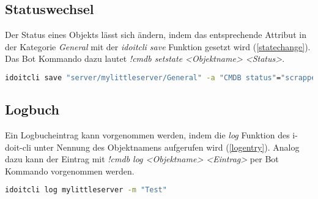 \subsection{Statuswechsel}
Der Status eines Objekts lässt sich ändern, indem das entsprechende Attribut in der Kategorie \textit{General} mit der \textit{idoitcli save} Funktion gesetzt wird (\autoref{statechange}). Das Bot Kommando dazu lautet \textit{!cmdb setstate <Objektname> <Status>}.
\begin{lstlisting}[language=bash, label=statechange, caption=Statuswechsel eines Objekts]
idoitcli save "server/mylittleserver/General" -a "CMDB status"="scrapped"
\end{lstlisting}

\subsection{Logbuch}
Ein Logbucheintrag kann vorgenommen werden, indem die \textit{log} Funktion des i-doit-cli unter Nennung des Objektnamens aufgerufen wird (\autoref{logentry}). Analog dazu kann der Eintrag mit \textit{!cmdb log <Objektname> <Eintrag>} per Bot Kommando vorgenommen werden.
\begin{lstlisting}[language=bash, label=logentry, caption=Logbucheintag]
idoitcli log mylittleserver -m "Test"
\end{lstlisting}
